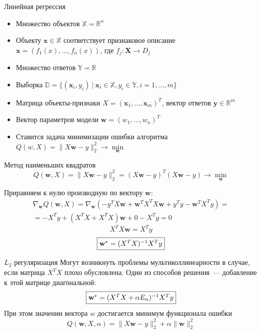 \documentclass{beamer} %
\newcommand{\R}{\mathbb{R}}
\newcommand{\norm}[1]{\lVert #1 \rVert_2}
\begin{document}
    \begin{frame}{Линейная регрессия}
        \begin{itemize}
            \item Множество объектов $\mathds{X} = \R^n$
            \item Объекту $\mathbf{x} \in \mathds{X}$ соответствует признаковое описание $\mathbf{x} = (f_1(x), \ldots, f_n(x))$,
            где $f_j: \mathbf{X} \to D_j$ 
            \item Множество ответов $\mathds{Y} = \R$
            \item Выборка $\mathds{D} = \{ (\mathbf{x}_i, y_i) \ | \ \mathbf{x}_i \in \mathds{X}, y_i \in \mathds{Y}, i = 1, \ldots, m \}$
            \item Матрица объекты-признаки $X = (\mathbf{x}_1, \ldots, \mathbf{x}_m)^T$, вектор ответов $\mathbf{y} \in \R^m$
            \item Вектор параметров модели $\mathbf{w} = (w_1, \ldots, w_n)^T$
            \item Ставится задача минимизации ошибки алгоритма $Q(w, X) = \lVert X \mathbf{w} - y \rVert_2^2 \to \min\limits_{\mathbf{w}}$
        \end{itemize}
    \end{frame}

    \begin{frame}{Метод наименьших квадратов}
        \[ Q(\mathbf{w}, X) = \lVert X \mathbf{w} - y \rVert_2^2 = (X \mathbf{w} - y)^T (X \mathbf{w} - y) \to \min\limits_{\mathbf{w}} \]

        Приравняем к нулю производную по вектору $\mathbf{w}$:
        \begin{multline*}
            \nabla_{\mathbf{w}} Q(\mathbf{w}, X) = \nabla_{\mathbf{w}}(-y^T X \mathbf{w} + \mathbf{w}^T X^T X \mathbf{w} + y^T y - \mathbf{w}^T X^T y) = \\ 
            = - X^T y + (X^T X + X^T X) \mathbf{w} + 0 - X^T y = 0
        \end{multline*}
        \[ X^T X \mathbf{w} = X^T y \]
        \[ \fbox{$\mathbf{w}^* = (X^T X)^{-1} X^T y$} \]

    \end{frame}

    \begin{frame}{$L_2$ регуляризация}
        Могут возникнуть проблемы мультиколлинеарности в случае, если матрица $X^T X$ плохо обусловлена.
        Один из способов решения~--- добавление к этой матрице диагональной:
        \[ \fbox{$\mathbf{w}^* = (X^T X + \alpha E_n)^{-1} X^T y$} \]
        При этом значении вектора $w$ достигается минимум функционала ошибки
        \[ Q(\mathbf{w}, X, \alpha) = \norm{X \mathbf{w} - y}^2 + \alpha \lVert \mathbf{w} \rVert_2^2 \]
    \end{frame}
\end{document}
